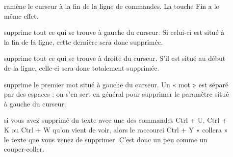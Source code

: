 \documentclass[letterpaper,10pt,french]{sphinxmanual}
\begin{document}
\begin{description}
\item[{}] \leavevmode
ramène le curseur à la fin de la ligne de commandes. La touche Fin a le même effet.

\item[{}] \leavevmode
supprime tout ce qui se trouve à gauche du curseur. Si celui-ci est situé à la fin de la ligne, cette dernière sera donc supprimée.

\item[{}] \leavevmode
supprime tout ce qui se trouve à droite du curseur. S’il est situé au début de la ligne, celle-ci sera donc totalement supprimée.

\item[{}] \leavevmode
supprime le premier mot situé à gauche du curseur. Un « mot » est séparé par des espaces ; on s’en sert en général pour supprimer le paramètre situé à gauche du curseur.

\item[{}] \leavevmode
si vous avez supprimé du texte avec une des commandes Ctrl + U, Ctrl + K ou Ctrl + W qu’on vient de voir, alors le raccourci Ctrl + Y « collera » le texte que vous venez de supprimer. C’est donc un peu comme un couper-coller.

\end{description}
\end{document}
